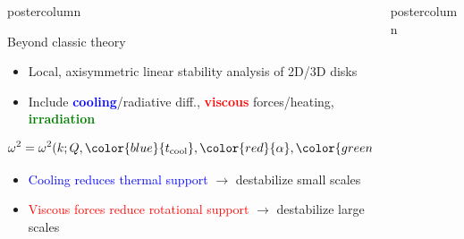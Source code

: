 \documentclass[final,hyperref={pdfpagelabels=false}]{beamer}
\newlength{\columnheight}
\begin{document}
\begin{frame}
\begin{columns}
\begin{column}{.49\textwidth}
\begin{beamercolorbox}[center,wd=\textwidth]{postercolumn}
\begin{minipage}[T]{.95\textwidth}
{            
            \begin{block}{\Large Beyond classic theory} 
              \justifying
              \begin{itemize}
              \item Local, axisymmetric linear stability analysis of 2D/3D disks 
              \item Include {\bf\textcolor{blue}{cooling}}/radiative
                diff., {\bf \textcolor{red}{viscous}} forces/heating,
                {\bf \textcolor{green}{irradiation}} 
              \end{itemize}
              \begin{displaybox}{23cm}
                \begin{align*}
                  \omega^2 = \omega^2(k; Q,
                        {\color{blue}{t_\mathrm{cool}} },
                        {\color{red}{\alpha}},
                        {\color{green}T_\mathrm{irr}}) 
                \end{align*}
          \end{displaybox}
              \begin{itemize}
              \item \textcolor{blue}{Cooling reduces thermal
                support}  $\to$ destabilize small scales 
              \item  \textcolor{red}{Viscous forces reduce rotational
                support} $\to$ destabilize large scales 
              \end{itemize}
             \end{block}
             
             
             
          }
        \end{minipage}
      \end{beamercolorbox}
    \end{column}
    
    \begin{column}{.49\textwidth}
      \begin{beamercolorbox}[center,wd=\textwidth]{postercolumn}
        \begin{minipage}[T]{.95\textwidth} %
          \parbox[t][\columnheight]{\textwidth}{   
    
}
\end{minipage}
\end{beamercolorbox}
\end{column}
\end{columns}
\end{frame}
\end{document}
